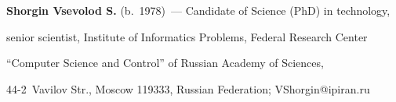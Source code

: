 \vspace*{3pt}


  


  


  \noindent


\textbf{Shorgin Vsevolod S.} (b.\ 1978)~--- Candidate of Science (PhD) in technology, 


senior scientist, Institute of Informatics Problems, Federal Research Center 


``Computer Science and Control'' of Russian Academy of Sciences, 


44-2~Vavilov Str., Moscow 119333, Russian Federation; \mbox{VShorgin@ipiran.ru}





  


\label{end\stat}








\renewcommand{\bibname}{\protect\rm Литература}


